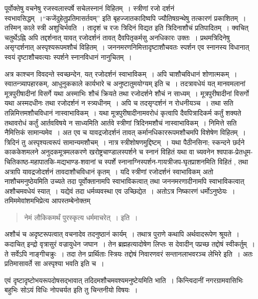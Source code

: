 {पूर्वोक्तेषु वचनेषु रजस्वलास्पर्षे सचेलस्नानं विहितम्~। स्त्रीणां रजो दर्शनं स्वभावसिद्धम्~।\break “कजेंदुहेतुप्रतिमासर्तवम्” इति बृहज्जातकादिष्वपि ज्यौतिषग्रन्थेषु तत्कारणं प्रकाशितम्~। तस्मिन् काले स्त्री अशुचिर्भवति~। तादृशं च रजः त्रिदिनं विद्यत इति त्रिदिनाशौचं प्रतिपादितम्~। क्वचित् चतुर्थेऽह्नि अपि तद्दर्शनात् यावत् रजोदर्शनं तावत् दैवपितृकर्मसु अनधिकारः उक्तः~। प्रथमत्रिदिनेषु असृग्दर्शनात् अस्पृश्यरूपमशौचं विहितम्~। जननमरणनिमित्तादृष्टा\-शौचवतः स्पर्शन एव स्नानस्य विधानात् स्वयं दृष्टाशौचवत्याः स्पर्शने स्नानविधानं नानुचितम्~। 

अत्र काश्चन विवदन्ते स्वच्छन्देन, यत् रजोदर्शनं स्वाभाविकम्~। अपि चाशौचविधानं शोणात्मकम्~। स्वातन्त्र्यापहारकम्, आधुनुककाले कार्यभारे च अनुष्टातुमयोग्यम् इति च~। तदत्रावधेयं यत् मानवमलानां मूत्रपुरीषादीनां विसर्गे यथा अस्माभिः शौचं क्रियते तथा रजोदर्शने शौचं न साध्यम्~। मूत्रपुरीषादीनां विसर्गो यथा अस्मदधीनः तथा रजोदर्शनं न स्त्र्यधीनम्~। अपि च तदसृग्दर्शनं न रोधनीयञ्च~। तथा सति तन्निमित्तमशौचविधानं नास्वाभाविकम्~। यथा मूत्रपुरीषादीनामवरोधं कृत्वापि दैवपित्रादिकर्म कर्तुं शक्यते तथावरोधं कर्तुं आर्तवविषये न साध्यमिति आर्तवे स्त्रीणां त्रिदिनमशौचं नास्वाभाविकम्~। निमित्ते सति नैमित्तिकं सामान्यमेव~। अत एव च यावद्रजोदर्शनं तावत् कर्मानधिकाररूपमशौचमपि विशेषेण विहितम्~। त्रिदिनं तु अस्पृश्यत्वरूपं सामान्यमशौचम्~। नात्र स्त्रीशोषणमुद्दिष्टम्~। यथा पैठीनसिना; स्कन्दने छर्दने काककेशमलने अनुदकमूत्रमलकरणे खरोष्ट्रचाण्डालस्पर्शने च स्नानं विहितं यथा वा च्यवनेन श्वपाक-प्रेतधूम-चितिकाष्ठ-महापातकि-मद्यभाण्ड-शवानां च स्पर्शे स्नानाग्निस्पर्शन-गायत्रीजप-घृतप्राशनमिति विहितं , तथा अत्रापि यावद्रजोदर्शनं तावदाशौचविधानं कृतम्~। यदि स्त्रीणां रजोदर्शनं स्वाभाविकम् अतो नाशौचमनुष्ठेयमिति उच्यते तदा पूर्वोक्तानामपि स्वाभाविकत्वात् तथा जननमरणादीनामपि स्वाभाविकत्वात् अशौचमवधेयं स्यात्~। यद्येवं तदा धर्मव्यवस्था एव उच्छिद्येत~। अतोऽत्र निष्कारणं धर्मोऽनुष्ठेयः~। तमिममेवांशमभिप्रेत्य आपस्तम्बेनोक्तम् 
~\\[-1cm]
\begin{verse}
नेमं लौकिकमर्थं पुरस्कृत्य धर्ममाचरेत्~। इति~। 
\end{verse}
अशौचं च अदृष्टरूपत्वात् वचनादेव तदनुष्ठानं कार्यम्~। तथात्र पुराणे कथापि अर्थवादरूपेण श्रूयते~। कदाचित् इन्द्रो वृत्रासुरं वज्रायुधेन जघान~। तेन ब्रह्महत्यादोषेण लिप्तः स देवादीन् पप्रच्छ तद्दोषं स्वीकर्तुम्~। ते सर्वेऽपि नाङ्गीचक्रुः~। तदा तेन प्रार्थिताः स्त्रियः तद्दोषं निवारणवरं सन्तानलाभवरञ्च लेभिरे इति~। अतः प्रतिमासावर्ते सा अस्पृश्या भवति इति च~। 

एवं दृष्टादृष्टोभयरूपदोषसद्भावात् तदिदमशौचमवश्यमनुष्टेयमिति भाति~। किन्त्विदानीं नगरग्रामवासिभिः बहुभिः सोऽयं विधिः नोपचर्यत इति तु चिन्तनीयो विषयः~। 
~\\[-1cm]
}
